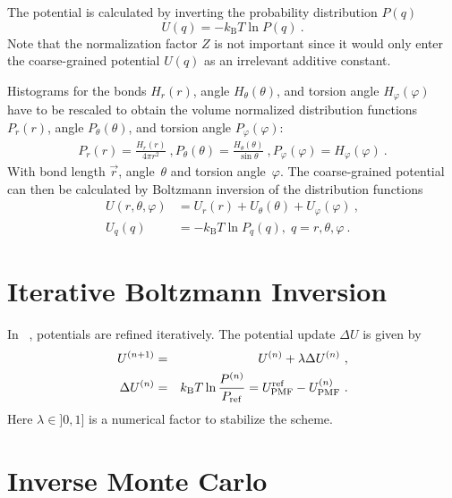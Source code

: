 The potential is calculated by inverting the probability distribution $P(q)$ 
\begin{equation}
  U(q) = - k_\text{B} T \ln  P(q) ~.
  \label{eq:inv_boltzmann}
\end{equation}
%
Note that the normalization factor $Z$ is not important since it would only enter the coarse-grained potential $U(q)$ as an irrelevant additive constant.

Histograms for the bonds $H_r(r)$, angle $H_\theta(\theta)$, and torsion angle $H_\varphi(\varphi)$ have to be rescaled to obtain the volume normalized distribution functions $P_r(r)$, angle $P_\theta(\theta)$, and torsion angle $P_\varphi(\varphi)$: 
%
\begin{align}
    P_r(r) = \frac{H_r(r)}{4\pi r^2}~,
    P_\theta(\theta) = \frac{H_\theta(\theta)}{\sin \theta}~,
    P_\varphi(\varphi) = H_\varphi (\varphi)~.
    \label{eq:boltzmann_norm}
\end{align}
With bond length $\vec{r}$, angle~$\theta$ and torsion angle~$\varphi$.%
The coarse-grained potential can then be calculated by Boltzmann inversion of the distribution functions
%
\begin{align}
    \label{eq:boltzmann_pmf}
    U({r}, \theta, \varphi) &= U_r({r}) + U_{\theta}(\theta) + U_{\varphi}(\varphi)~, \\
    U_q({q}) &= - k_\text{B} T \ln P_q( q ),\; q=r, \theta, \varphi~.
    \nonumber
\end{align}

\section{Iterative Boltzmann Inversion}
\label{sec:ibi}

In \ibi~\cite{Reith:2003}, potentials are refined iteratively. The potential update $\Delta U$ is given by
\begin{eqnarray}
  \label{eq:iter_boltzmann}
  U^{(n+1)} &=& U^{(n)} + \lambda \Delta U^{(n)}~, \\
  \Delta U^{(n)} &=&  k_\text{B} T \ln  \frac{P^{(n)}}{P_{\rm ref}}
  =  U_\text{PMF}^\text{ref} - U_\text{PMF}^{(n)}~.
\end{eqnarray}
Here $\lambda \in ]0,1]$ is a numerical factor to stabilize the scheme.

\section{Inverse Monte Carlo}
\label{sec:imc}

